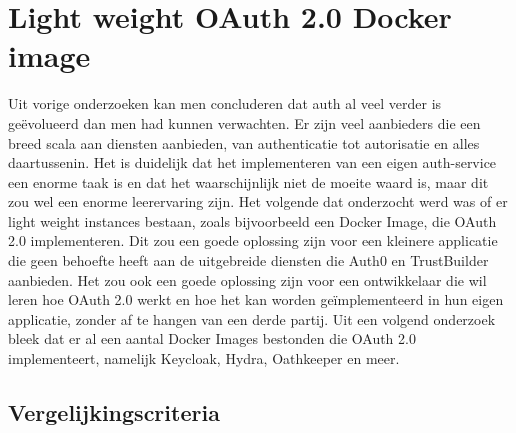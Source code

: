 \section{Light weight OAuth 2.0 Docker image}%
\label{sec:light-weight-oauth-2.0-docker-image}
Uit vorige onderzoeken kan men concluderen dat auth al veel verder is geëvolueerd dan men had kunnen verwachten. Er zijn veel aanbieders die een breed scala aan diensten aanbieden, van authenticatie tot autorisatie en alles daartussenin. Het is duidelijk dat het implementeren van een eigen auth-service een enorme taak is en dat het waarschijnlijk niet de moeite waard is, maar dit zou wel een enorme leerervaring zijn.
\newline
\newline
Het volgende dat onderzocht werd was of er light weight instances bestaan, zoals bijvoorbeeld een Docker Image, die OAuth 2.0 implementeren. Dit zou een goede oplossing zijn voor een kleinere applicatie die geen behoefte heeft aan de uitgebreide diensten die Auth0 en TrustBuilder aanbieden. Het zou ook een goede oplossing zijn voor een ontwikkelaar die wil leren hoe OAuth 2.0 werkt en hoe het kan worden geïmplementeerd in hun eigen applicatie, zonder af te hangen van een derde partij.
\newline
\newline
Uit een volgend onderzoek bleek dat er al een aantal Docker Images bestonden die OAuth 2.0 implementeert, namelijk Keycloak, Hydra, Oathkeeper en meer.


\subsection{Vergelijkingscriteria}%
\label{subsec:vergelijkingscriteria}

